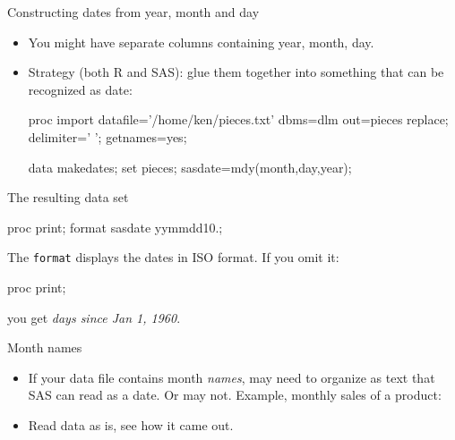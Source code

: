 \documentclass[unknownkeysallowed]{beamer}\usepackage[]{graphicx}\usepackage[]{color}
\begin{document}
\begin{frame}[fragile]{Constructing dates from year, month and day}
  
  \begin{itemize}
    
  \item You might have separate columns containing year, month, day.
  \item Strategy (both R and SAS): glue them together into something
    that can be recognized as date:
    \begin{Datastep}
proc import
  datafile='/home/ken/pieces.txt'
    dbms=dlm
    out=pieces
    replace;
  delimiter=' ';
  getnames=yes;
  
data makedates;
  set pieces;
  sasdate=mdy(month,day,year);
    \end{Datastep}
    
  \end{itemize}
  
\end{frame}

\begin{frame}[fragile]{The resulting data set}

    \begin{Sascode}[store=dd]
proc print;
  format sasdate yymmdd10.;
    \end{Sascode}


The \texttt{format} displays the dates in ISO format. If you omit it:

    \begin{Sascode}[store=dda]
proc print;
    \end{Sascode}


you get \emph{days since Jan 1, 1960}.
  
  
\end{frame}


\begin{frame}[fragile]{Month names}
  
  \begin{itemize}
  \item If your data file contains month \emph{names}, may need to
    organize as text that SAS can read as a date. Or may not.
    Example, monthly sales of a product:
    
    
    
  \item Read data as is, see how it came out.
  \end{itemize}
  
\end{frame}
\end{document}
